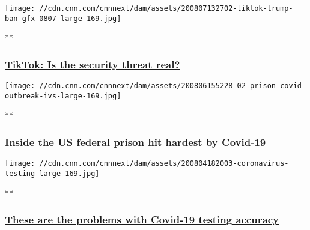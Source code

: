 \href{/videos/business/2020/08/07/tiktok-national-security-orig.cnn-business/video/playlists/top-news-videos/}{}

\texttt{[image: //cdn.cnn.com/cnnnext/dam/assets/200807132702-tiktok-trump-ban-gfx-0807-large-169.jpg]}

**

\hypertarget{tiktok-is-the-security-threat-real}{%
\subsubsection{\texorpdfstring{\href{/videos/business/2020/08/07/tiktok-national-security-orig.cnn-business/video/playlists/top-news-videos/}{TikTok:
Is the security threat
real?}}{TikTok: Is the security threat real?}}\label{tiktok-is-the-security-threat-real}}

\href{/videos/health/2020/08/07/texas-federal-prison-outbreak-griffin-pkg-vpx.cnn/video/playlists/top-news-videos/}{}

\texttt{[image: //cdn.cnn.com/cnnnext/dam/assets/200806155228-02-prison-covid-outbreak-ivs-large-169.jpg]}

**

\hypertarget{inside-the-us-federal-prison-hit-hardest-by-covid-19-}{%
\subsubsection{\texorpdfstring{\href{/videos/health/2020/08/07/texas-federal-prison-outbreak-griffin-pkg-vpx.cnn/video/playlists/top-news-videos/}{Inside
the US federal prison hit hardest by Covid-19
}}{Inside the US federal prison hit hardest by Covid-19 }}\label{inside-the-us-federal-prison-hit-hardest-by-covid-19-}}

\href{/videos/health/2020/08/08/coronavirus-testing-inaccuracies-kaye-pkg-ac360-vpx.cnn/video/playlists/top-news-videos/}{}

\texttt{[image: //cdn.cnn.com/cnnnext/dam/assets/200804182003-coronavirus-testing-large-169.jpg]}

**

\hypertarget{these-are-the-problems-with-covid-19-testing-accuracy}{%
\subsubsection{\texorpdfstring{\href{/videos/health/2020/08/08/coronavirus-testing-inaccuracies-kaye-pkg-ac360-vpx.cnn/video/playlists/top-news-videos/}{These
are the problems with Covid-19 testing
accuracy}}{These are the problems with Covid-19 testing accuracy}}\label{these-are-the-problems-with-covid-19-testing-accuracy}}

